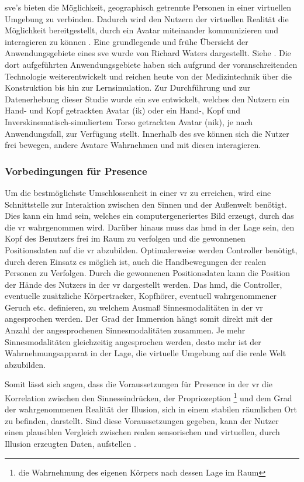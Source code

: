 \documentclass[a4paper,11pt]{article}%
\renewcommand{\\}{\vspace*{0.5\baselineskip} \newline}
\begin{document}
	\ac{sve}'s bieten die Möglichkeit, geographisch getrennte Personen in einer virtuellen Umgebung zu verbinden. Dadurch wird den Nutzern der virtuellen Realität die Möglichkeit bereitgestellt, durch ein Avatar miteinander kommunizieren und interagieren zu können \citep[p. 1-3]{pettifer1999designing}. Eine grundlegende und frühe Übersicht der Anwendungsgebiete eines \ac{sve} wurde von Richard Waters dargestellt. Siehe \citep{waters1997rise}. Die dort aufgeführten Anwendungsgebiete haben sich aufgrund der voranschreitenden Technologie weiterentwickelt und reichen heute von der Medizintechnik über die Konstruktion bis hin zur Lernsimulation.
	Zur Durchführung und zur Datenerhebung dieser Studie wurde ein \ac{sve} entwickelt, welches den Nutzern ein \dq{}Hand- und Kopf getrackten Avatar\dq{} (\ac{ik}) oder ein \dq{}Hand-, Kopf und Inverskinematisch-simuliertem Torso getrackten Avatar\dq{} (\ac{nik}), je nach Anwendungsfall, zur Verfügung stellt. Innerhalb des \ac{sve} können sich die Nutzer frei bewegen, andere Avatare Wahrnehmen und mit diesen interagieren.
	
	
		\subsubsection{Vorbedingungen für Presence}
Um die bestmöglichste Umschlossenheit in einer \ac{vr} zu erreichen, wird eine Schnittstelle zur Interaktion zwischen den Sinnen und der Außenwelt benötigt. Dies kann ein \ac{hmd} sein, welches ein computergeneriertes Bild erzeugt, durch das die \ac{vr} wahrgenommen wird. Darüber hinaus muss das \ac{hmd} in der Lage sein, den Kopf des Benutzers frei im Raum zu verfolgen und die gewonnenen Positionsdaten auf die \ac{vr} abzubilden. Optimalerweise werden Controller benötigt, durch deren Einsatz es möglich ist, auch die Handbewegungen der realen Personen zu Verfolgen. Durch die gewonnenen Positionsdaten kann die Position der Hände des Nutzers in der \ac{vr} dargestellt werden. Das \ac{hmd}, die Controller, eventuelle zusätzliche Körpertracker, Kopfhörer, eventuell wahrgenommener Geruch etc. definieren, zu welchem Ausmaß Sinnesmodalitäten in der \ac{vr} angesprochen werden. Der Grad der Immersion hängt somit direkt mit der Anzahl der angesprochenen Sinnesmodalitäten zusammen. Je mehr Sinnesmodalitäten gleichzeitig angesprochen werden, desto mehr ist der Wahrnehmungsapparat in der Lage, die virtuelle Umgebung auf die reale Welt abzubilden.

Somit lässt sich sagen, dass die Voraussetzungen für \dq Presence\dq{} in der \ac{vr} die Korrelation zwischen den Sinneseindrücken, der Propriozeption \footnote{die Wahrnehmung des eigenen Körpers nach dessen Lage im Raum} und dem Grad der wahrgenommenen Realität der Illusion, sich in einem stabilen räumlichen Ort zu befinden, darstellt. Sind diese Voraussetzungen gegeben, kann der Nutzer einen plausiblen Vergleich zwischen realen sensorischen und virtuellen, durch Illusion erzeugten Daten, aufstellen \citep{slater2009we}.
\end{document}
